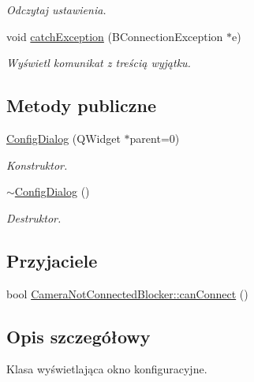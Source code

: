 \begin{CompactItemize}
\begin{CompactList}\small\item\em Odczytaj ustawienia. \item\end{CompactList}\item 
\hypertarget{class_config_dialog_99f28a7e313ccc20892503afdc3191b9}{
void \hyperlink{class_config_dialog_99f28a7e313ccc20892503afdc3191b9}{catchException} (BConnectionException $\ast$e)}
\label{class_config_dialog_99f28a7e313ccc20892503afdc3191b9}

\begin{CompactList}\small\item\em Wyświetl komunikat z treścią wyjątku. \item\end{CompactList}\end{CompactItemize}
\subsection*{Metody publiczne}
\begin{CompactItemize}
\item 
\hyperlink{class_config_dialog_d16df8ed2e55bd5cc55e3ef9040b8b93}{ConfigDialog} (QWidget $\ast$parent=0)
\begin{CompactList}\small\item\em Konstruktor. \item\end{CompactList}\item 
\hyperlink{class_config_dialog_485badac4dffa04603f800bb9d396e1d}{$\sim$ConfigDialog} ()
\begin{CompactList}\small\item\em Destruktor. \item\end{CompactList}\end{CompactItemize}
\subsection*{Przyjaciele}
\begin{CompactItemize}
\item 
bool \hyperlink{class_config_dialog_3b0963bb150b18a9cbd3b46187f7ea26}{CameraNotConnectedBlocker::canConnect} ()
\end{CompactItemize}


\subsection{Opis szczegółowy}
Klasa wyświetlająca okno konfiguracyjne. 

